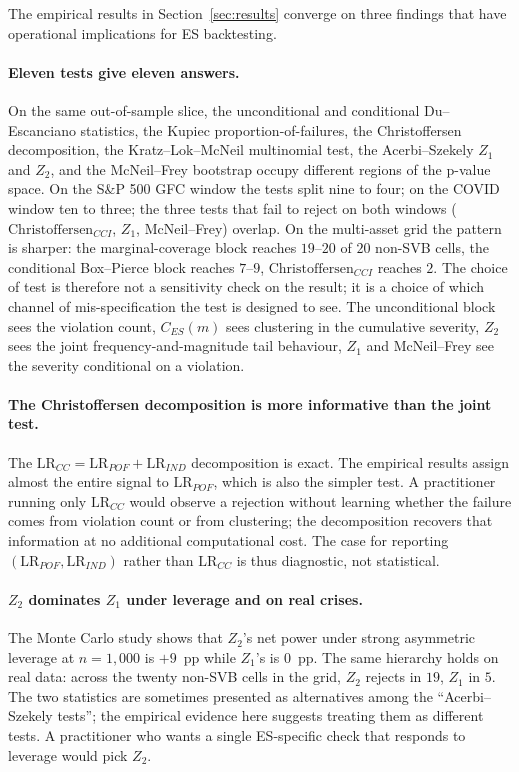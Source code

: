 \documentclass[11pt,a4paper]{article}
\theoremstyle{plain}
\begin{document}
The empirical results in Section~\ref{sec:results} converge on three
findings that have operational implications for ES backtesting.

\paragraph{Eleven tests give eleven answers.} On the same out-of-sample
slice, the unconditional and conditional Du--Escanciano statistics,
the Kupiec proportion-of-failures, the Christoffersen decomposition,
the Kratz--Lok--McNeil multinomial test, the Acerbi--Szekely $Z_1$
and $Z_2$, and the McNeil--Frey bootstrap occupy different regions of
the p-value space. On the S\&P 500 GFC window the tests split nine
to four; on the COVID window ten to three; the three tests that fail
to reject on both windows ($\mathrm{Christoffersen}_{CCI}$, $Z_1$,
McNeil--Frey) overlap. On the multi-asset grid the pattern is
sharper: the marginal-coverage block reaches $19$--$20$ of $20$
non-SVB cells, the conditional Box--Pierce block reaches $7$--$9$,
$\mathrm{Christoffersen}_{CCI}$ reaches $2$. The choice of test is
therefore not a sensitivity check on the result; it is a choice of
which channel of mis-specification the test is designed to see. The
unconditional block sees the violation count, $C_{ES}(m)$ sees
clustering in the cumulative severity, $Z_2$ sees the joint
frequency-and-magnitude tail behaviour, $Z_1$ and McNeil--Frey see
the severity conditional on a violation.

\paragraph{The Christoffersen decomposition is more informative than
the joint test.} The $\mathrm{LR}_{CC} = \mathrm{LR}_{POF} +
\mathrm{LR}_{IND}$ decomposition is exact. The empirical results
assign almost the entire signal to $\mathrm{LR}_{POF}$, which is also
the simpler test. A practitioner running only $\mathrm{LR}_{CC}$
would observe a rejection without learning whether the failure
comes from violation count or from clustering; the decomposition
recovers that information at no additional computational cost. The
case for reporting $(\mathrm{LR}_{POF}, \mathrm{LR}_{IND})$ rather
than $\mathrm{LR}_{CC}$ is thus diagnostic, not statistical.

\paragraph{$Z_2$ dominates $Z_1$ under leverage and on real crises.}
The Monte Carlo study shows that $Z_2$'s net power under strong
asymmetric leverage at $n = 1{,}000$ is $+9$~pp while $Z_1$'s is
$0$~pp. The same hierarchy holds on real data: across the twenty
non-SVB cells in the grid, $Z_2$ rejects in $19$, $Z_1$ in $5$.
The two statistics are sometimes presented as alternatives among the
``Acerbi--Szekely tests''; the empirical evidence here suggests
treating them as different tests. A practitioner who wants a single
ES-specific check that responds to leverage would pick $Z_2$.
\end{document}
